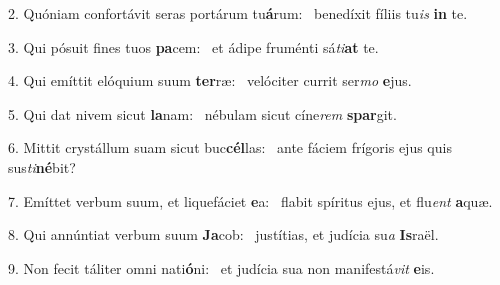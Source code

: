 2. Quóniam confortávit seras portárum tu\textbf{á}rum: \ast\  benedíxit fíliis tu\textit{is} \textbf{in} te.\

3. Qui pósuit fines tuos \textbf{pa}cem: \ast\  et ádipe fruménti sá\textit{ti}\textbf{at} te.\

4. Qui emíttit elóquium suum \textbf{ter}ræ: \ast\  velóciter currit ser\textit{mo} \textbf{e}jus.\

5. Qui dat nivem sicut \textbf{la}nam: \ast\  nébulam sicut cíne\textit{rem} \textbf{spar}git.\

6. Mittit crystállum suam sicut buc\textbf{cél}las: \ast\  ante fáciem frígoris ejus quis sus\textit{ti}\textbf{né}bit?\

7. Emíttet verbum suum, et liquefáciet \textbf{e}a: \ast\  flabit spíritus ejus, et flu\textit{ent} \textbf{a}quæ.\

8. Qui annúntiat verbum suum \textbf{Ja}cob: \ast\  justítias, et judícia su\textit{a} \textbf{Is}raël.\

9. Non fecit táliter omni nati\textbf{ó}ni: \ast\  et judícia sua non manifestá\textit{vit} \textbf{e}is.\

